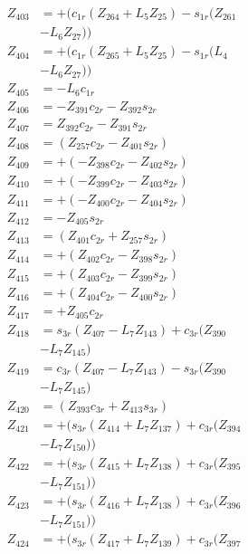 \begin{multicols}{2}
\begin{align}
Z_{403} &= + (c_{1r}(Z_{264} + L_5Z_{25}) - s_{1r}(Z_{261}  \nonumber \\
&- L_6Z_{27})) \nonumber \\
Z_{404} &= + (c_{1r}(Z_{265} + L_5Z_{25}) - s_{1r}(L_4  \nonumber \\
&- L_6Z_{27})) \nonumber \\
Z_{405} &= - L_6c_{1r} \nonumber \\
Z_{406} &= - Z_{391}c_{2r} - Z_{392}s_{2r} \nonumber \\
Z_{407} &=   Z_{392}c_{2r} - Z_{391}s_{2r} \nonumber \\
Z_{408} &= (Z_{257}c_{2r} - Z_{401}s_{2r}) \nonumber \\
Z_{409} &= + (- Z_{398}c_{2r} - Z_{402}s_{2r}) \nonumber \\
Z_{410} &= + (- Z_{399}c_{2r} - Z_{403}s_{2r}) \nonumber \\
Z_{411} &= + (- Z_{400}c_{2r} - Z_{404}s_{2r}) \nonumber \\
Z_{412} &= - Z_{405}s_{2r} \nonumber \\
Z_{413} &= (Z_{401}c_{2r} + Z_{257}s_{2r}) \nonumber \\
Z_{414} &= + (Z_{402}c_{2r} - Z_{398}s_{2r}) \nonumber \\
Z_{415} &= + (Z_{403}c_{2r} - Z_{399}s_{2r}) \nonumber \\
Z_{416} &= + (Z_{404}c_{2r} - Z_{400}s_{2r}) \nonumber \\
Z_{417} &= + Z_{405}c_{2r} \nonumber \\
Z_{418} &= s_{3r}(Z_{407} - L_7Z_{143}) + c_{3r}(Z_{390}  \nonumber \\
&- L_7Z_{145}) \nonumber \\
Z_{419} &= c_{3r}(Z_{407} - L_7Z_{143}) - s_{3r}(Z_{390}  \nonumber \\
&- L_7Z_{145}) \nonumber \\
Z_{420} &= (Z_{393}c_{3r} + Z_{413}s_{3r}) \nonumber \\
Z_{421} &= + (s_{3r}(Z_{414} + L_7Z_{137}) + c_{3r}(Z_{394}  \nonumber \\
&- L_7Z_{150})) \nonumber \\
Z_{422} &= + (s_{3r}(Z_{415} + L_7Z_{138}) + c_{3r}(Z_{395}  \nonumber \\
&- L_7Z_{151})) \nonumber \\
Z_{423} &= + (s_{3r}(Z_{416} + L_7Z_{138}) + c_{3r}(Z_{396}  \nonumber \\
&- L_7Z_{151})) \nonumber \\
Z_{424} &= + (s_{3r}(Z_{417} + L_7Z_{139}) + c_{3r}(Z_{397}  \nonumber \\

\end{align}
\end{multicols}
